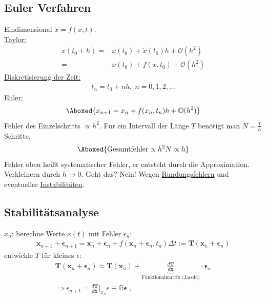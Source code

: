 \documentclass[12pt]{article}
\begin{document}
\begin{enumerate}
\subsection{Euler Verfahren}
Eindimensional $\dot{x}= f(x,t)$.\\  %
\underline{Taylor:}
\begin{align}
x(t_0 +h)=& x(t_0) + \dot{x}(t_0)h+ \mathcal{O} (h^2) \\
=& x(t_0) + f(x,t_0) + \mathcal{O} (h^2)
\end{align}
\underline{Diskretisierung der Zeit:}
\begin{align}
t_n = t_0 + nh, \; n=0,1,2,...
\end{align}
\underline{Euler:}
\begin{align}
\Aboxed{ x_{n+1}= x_n + f(x_n, t_n)h+ \mathbb{O}(h^2)}
\end{align}
Fehler des Einzelschritts $\propto h^2$. Für ein Intervall der Länge $T$ benötigt man $N= \frac{T}{h}$ Schritte.
\begin{align}
\Aboxed{ \mbox{Gesamtfehler} \propto h^2 N \propto h }
\end{align}
Fehler oben heißt systematischer Fehler, er entsteht durch die Approximation. Verkleinern durch $h \to 0$. Geht das? Nein! Wegen \underline{Rundungsfehlern} und eventueller \underline{Instabilitäten}.
\end{enumerate}

\subsection{Stabilitätsanalyse}
$x_n$: berechne Werte $x(t)$ mit Fehler $\epsilon_n$:
\begin{align}
\mathbf{x}_{n+1} + \mathbf{\epsilon}_{n+1} =\mathbf{x}_n + \mathbf{\epsilon}_n + f( \mathbf{x}_n + \mathbf{\epsilon}_n, t_n) \Delta t := \mathbf{T}(\mathbf{x}_n + \mathbf{\epsilon}_n)
\end{align} %
 entwickle $T$ für kleines $\epsilon$: 
 \begin{align}
 \mathbf{T}(\mathbf{x}_n + \mathbf{\epsilon}_n) 
 \approx \mathbf{T}(\mathbf{x}_n) + \underbrace{\frac{d\mathbf{T}}{d\mathbf{x}}}_\text{Funktionalmatrix (Jacobi)} \cdot \mathbf{\epsilon}_n \\
 \Rightarrow \epsilon_{n+1} = \frac{d\mathbf{T}}{d\mathbf{x}} \vert _{x_n} \epsilon \equiv \mathbb{G} \mathbf{\epsilon} \; ,
 \end{align}
 
\end{document}
